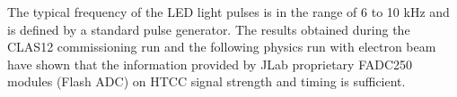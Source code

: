 \indent The typical frequency of the LED light pulses is in the range of 6 to 10 kHz and is defined by a standard pulse generator. The results obtained during the CLAS12 commissioning run and the following physics run with electron beam have shown that the information provided by JLab proprietary FADC250 modules (Flash ADC) on HTCC signal strength and timing is sufficient. 

